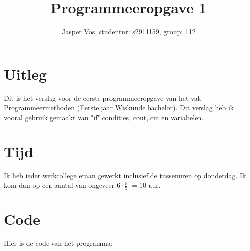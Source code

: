 \documentclass[10pt]{article}
\title{Programmeeropgave 1}
\author{Jasper Vos, studentnr: s2911159, group: 112}
\begin{document}

\maketitle

\section{Uitleg}
Dit is het verslag voor de eerste programmeeropgave van het vak Programmeermethoden (Eerste jaar Wiskunde bachelor).
Dit verslag heb ik vooral gebruik gemaakt van "if" condities, cout, cin en variabelen.

\section{Tijd}
Ik heb ieder werkcollege eraan gewerkt inclusief de tussenuren op donderdag.
Ik kom dan op een aantal van ongeveer $6\cdot\frac{5}{3} \cdot  = 10$ uur.

\section*{Code}
Hier is de code van het programma:


\end{document}
